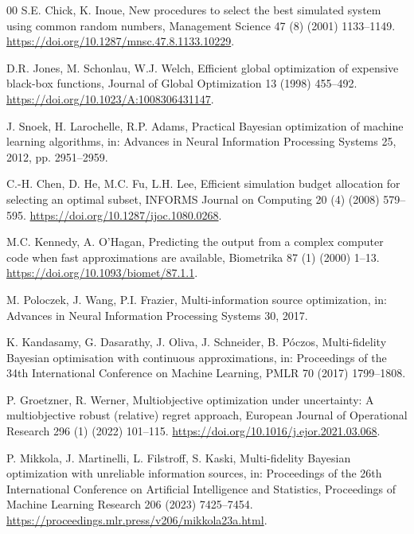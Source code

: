 \documentclass[preprint,12pt]{elsarticle}
\begin{document}
\begin{thebibliography}{00}
S.E. Chick, K. Inoue,
New procedures to select the best simulated system using common random numbers,
Management Science 47 (8) (2001) 1133--1149.
\newblock \url{https://doi.org/10.1287/mnsc.47.8.1133.10229}.

D.R. Jones, M. Schonlau, W.J. Welch,
Efficient global optimization of expensive black-box functions,
Journal of Global Optimization 13 (1998) 455--492.
\newblock \url{https://doi.org/10.1023/A:1008306431147}.

J. Snoek, H. Larochelle, R.P. Adams,
Practical Bayesian optimization of machine learning algorithms,
in: Advances in Neural Information Processing Systems 25, 2012, pp. 2951--2959.

C.-H. Chen, D. He, M.C. Fu, L.H. Lee,
Efficient simulation budget allocation for selecting an optimal subset,
INFORMS Journal on Computing 20 (4) (2008) 579--595.
\newblock \url{https://doi.org/10.1287/ijoc.1080.0268}.


M.C. Kennedy, A. O'Hagan,
Predicting the output from a complex computer code when fast approximations are available,
Biometrika 87 (1) (2000) 1--13.
\newblock \url{https://doi.org/10.1093/biomet/87.1.1}.

M. Poloczek, J. Wang, P.I. Frazier,
Multi-information source optimization,
in: Advances in Neural Information Processing Systems 30, 2017.

K. Kandasamy, G. Dasarathy, J. Oliva, J. Schneider, B. P\'{o}czos,
Multi-fidelity Bayesian optimisation with continuous approximations,
in: Proceedings of the 34th International Conference on Machine Learning,
PMLR 70 (2017) 1799--1808.

P. Groetzner, R. Werner,
Multiobjective optimization under uncertainty: A multiobjective robust (relative) regret approach,
European Journal of Operational Research 296 (1) (2022) 101--115.
\newblock \url{https://doi.org/10.1016/j.ejor.2021.03.068}.

P. Mikkola, J. Martinelli, L. Filstroff, S. Kaski,
Multi-fidelity Bayesian optimization with unreliable information sources,
in: Proceedings of the 26th International Conference on Artificial Intelligence and Statistics,
Proceedings of Machine Learning Research 206 (2023) 7425--7454.
\newblock \url{https://proceedings.mlr.press/v206/mikkola23a.html}.


\end{thebibliography}
\end{document}
